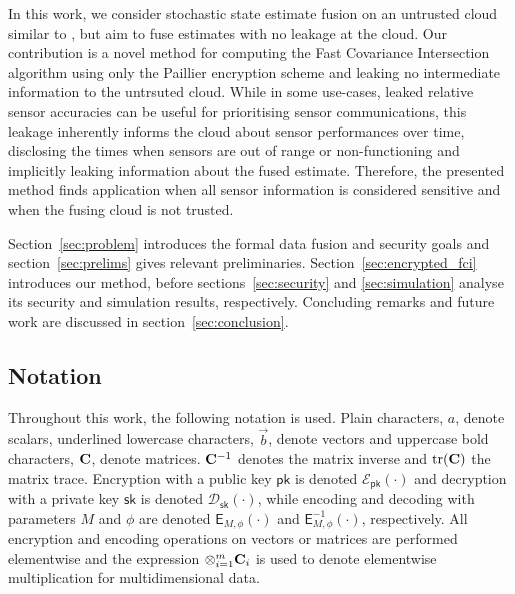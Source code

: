 \documentclass[letterpaper, 10 pt, conference]{ieeeconf}
\begin{document}
In this work, we consider stochastic state estimate fusion on an untrusted cloud similar to \cite{risticSecureFastCovariance2021}, but aim to fuse estimates with no leakage at the cloud. Our contribution is a novel method for computing the Fast Covariance Intersection algorithm using only the Paillier encryption scheme and leaking no intermediate information to the untrsuted cloud. While in some use-cases, leaked relative sensor accuracies can be useful for prioritising sensor communications, this leakage inherently informs the cloud about sensor performances over time, disclosing the times when sensors are out of range or non-functioning and implicitly leaking information about the fused estimate. Therefore, the presented method finds application when all sensor information is considered sensitive and when the fusing cloud is not trusted.

Section~\ref{sec:problem} introduces the formal data fusion and security goals and section~\ref{sec:prelims} gives relevant preliminaries. Section~\ref{sec:encrypted_fci} introduces our method, before sections~\ref{sec:security} and \ref{sec:simulation} analyse its security and simulation results, respectively. Concluding remarks and future work are discussed in section~\ref{sec:conclusion}.

\subsection{Notation}
Throughout this work, the following notation is used. Plain characters, $a$, denote scalars, underlined lowercase characters, $\vec{b}$, denote vectors and uppercase bold characters, ${{\mathbf{C}}}$, denote matrices. ${{\mathbf{C}}}^{-1}$ denotes the matrix inverse and $\operatorname{tr}({{\mathbf{C}}})$ the matrix trace. Encryption with a public key $\mathsf{pk}$ is denoted $\mathcal{E}_{\mathsf{pk}}(\cdot)$ and decryption with a private key $\mathsf{sk}$ is denoted $\mathcal{D}_{\mathsf{sk}}(\cdot)$, while encoding and decoding with parameters $M$ and $\phi$ are denoted $\mathsf{E}_{M,\phi}(\cdot)$ and $\mathsf{E}^{-1}_{M,\phi}(\cdot)$, respectively. All encryption and encoding operations on vectors or matrices are performed elementwise and the expression $\otimes_{i=1}^{m}{{\mathbf{C}}}_i$ is used to denote elementwise multiplication for multidimensional data.

% 
%                                              
%                                              
%                                              
% 
\end{document}
